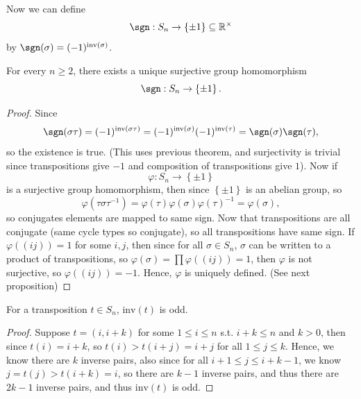 Now we can define 
    \[
        \sgn : S_n \to \left\{ \pm 1 \right\} \subseteq \mathbb{R} ^{\times }
    \] by \(\sgn (\sigma ) = (-1)^{\mathrm{inv}(\sigma ) }\). 
    \begin{theorem}
        For every \(n \ge 2\), there exists a unique surjective group homomorphism 
        \[
            \sgn : S_n \to \left\{ \pm 1 \right\}. 
        \] 
    \end{theorem} 
    \begin{proof}
        Since 
        \[
            \sgn (\sigma \tau ) = (-1)^{\mathrm{inv}(\sigma \tau)  } = (-1)^{\mathrm{inv}(\sigma ) } (-1)^{\mathrm{inv}(\tau ) } = \sgn (\sigma ) \sgn (\tau ),
        \] so the existence is true. (This uses previous theorem, and surjectivity is trivial since transpositions give \(-1\) and composition of transpositions give \(1\)). Now if 
        \[
            \varphi : S_n \to \left\{ \pm 1 \right\} 
        \] is a surjective group homomorphism, then since \(\left\{ \pm 1 \right\} \) is an abelian group, so 
        \[
            \varphi (\tau \sigma \tau ^{-1}) = \varphi (\tau ) \varphi (\sigma ) \varphi (\tau )^{-1} = \varphi (\sigma ),
        \] so conjugates elements are mapped to same sign. Now that transpositions are all conjugate (same cycle types so conjugate), so all transpositions have same sign. If \(\varphi ((ij)) = 1\) for some \(i, j\), then since for all \(\sigma \in S_n\), \(\sigma \) can be written to a product of transpositions, so \(\varphi (\sigma ) = \prod \varphi ((ij)) = 1\), then \(\varphi \) is not surjective, so \(\varphi ((ij)) = -1\). Hence, \(\varphi \) is uniquely defined. (See next proposition)        
    \end{proof}

    \begin{lemma}
        For a transposition \(t \in S_n\), \(\mathrm{inv}(t) \) is odd.  
    \end{lemma}
    \begin{proof}
        Suppose \(t = (i, i + k)\) for some \(1 \le i \le n\) s.t. \(i + k \le n\) and \(k > 0\), then since \(t(i) = i + k\), so \(t(i) > t(i + j) = i + j\) for all \(1 \le j \le k\). Hence, we know there are \(k\) inverse pairs, also since for all \(i + 1 \le j \le i + k - 1\), we know \(j = t(j) > t(i + k) = i\), so there are \(k - 1\) inverse pairs, and thus there are \(2k - 1\) inverse pairs, and thus \(\mathrm{inv}(t) \) is odd.            
    \end{proof}

